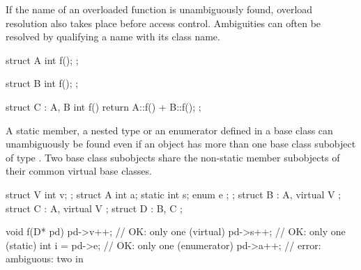 \pnum
{}%
If the name of an overloaded function is unambiguously found,
overload resolution also takes place before access
control.
%
Ambiguities can often be resolved by qualifying a name with its class name.
\begin{example}
\begin{codeblock}
struct A {
  int f();
};

\end{codeblock}
\begin{codeblock}
struct B {
  int f();
};

\end{codeblock}
\begin{codeblock}
struct C : A, B {
  int f() { return A::f() + B::f(); }
};
\end{codeblock}
\end{example}

\pnum
\begin{note}
A static member, a nested type or an enumerator defined in a base class
 can unambiguously be found even if an object has more than one
base class subobject of type . Two base class subobjects share
the non-static member subobjects of their common virtual base classes.
\end{note}
\begin{example}
\begin{codeblock}
struct V {
  int v;
};
struct A {
  int a;
  static int   s;
  enum { e };
};
struct B : A, virtual V { };
struct C : A, virtual V { };
struct D : B, C { };

void f(D* pd) {
  pd->v++;          // OK: only one  (virtual)
  pd->s++;          // OK: only one  (static)
  int i = pd->e;    // OK: only one  (enumerator)
  pd->a++;          // error: ambiguous: two  in 
}
\end{codeblock}
\end{example}

